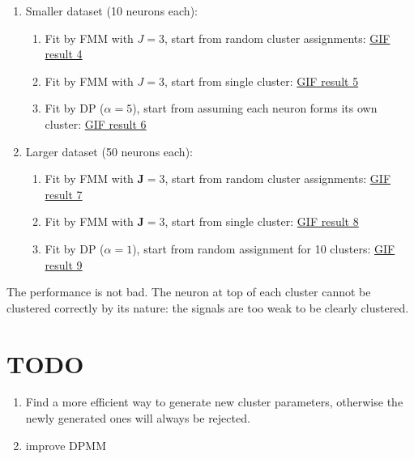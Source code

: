 \documentclass[]{article}
\begin{document}
\begin{enumerate}
	\def\labelenumi{(\arabic{enumi})}
	\item
	Smaller dataset (10 neurons each):\\
	\begin{enumerate}
		\def\labelenumi{\alph{enumi}.}
		\item
		Fit by FMM with \(J = 3\), start from random cluster assignments:
		\href{https://github.com/weigcdsb/state-space-clustering/blob/main/results/gif/noA_10_MM_above.gif}{GIF result 4}
		\item
		Fit by FMM with \(J = 3\), start from single cluster:
		\href{https://github.com/weigcdsb/state-space-clustering/blob/main/results/gif/noA_10_MM_below.gif}{GIF result 5}
		\item
		Fit by DP (\(\alpha = 5\)), start from assuming each neuron forms its own cluster:
		\href{https://github.com/weigcdsb/state-space-clustering/blob/main/results/gif/noA_10_DP_above_5.gif}{GIF result 6}
	\end{enumerate}
	
	\item
	Larger dataset (50 neurons each):\\
	\begin{enumerate}
		\def\labelenumi{\alph{enumi}.}
		\item
		Fit by FMM with \(\mathbf{J} = 3\), start from random cluster assignments:
		\href{https://github.com/weigcdsb/state-space-clustering/blob/main/results/gif/noA_50_MM_above.gif}{GIF result 7}
		\item
		Fit by FMM with \(\mathbf{J} = 3\), start from single cluster:
		\href{https://github.com/weigcdsb/state-space-clustering/blob/main/results/gif/noA_50_MM_below.gif}{GIF result 8}
		\item
		Fit by DP (\(\alpha = 1\)), start from random assignment for 10 clusters:
		\href{https://github.com/weigcdsb/state-space-clustering/blob/main/results/gif/noA_50_DP_above1.gif}{GIF result 9}
	\end{enumerate}
\end{enumerate}

The performance is not bad. The neuron at top of each cluster cannot be clustered correctly by its nature: the signals are too weak to be clearly clustered.

\section{TODO}
\begin{enumerate}
	\def\labelenumi{(\arabic{enumi})}
	\item
	Find a more efficient way to generate new cluster parameters, otherwise the newly generated ones will always be rejected.
	\item
	improve DPMM
\end{enumerate}
\end{document}
